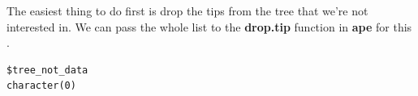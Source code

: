 \documentclass[
]{book}
\newenvironment{Shaded}{\begin{snugshade}}{\end{snugshade}}
\newcommand{\KeywordTok}[1]{\textcolor[rgb]{0.13,0.29,0.53}{\textbf{#1}}}
\newcommand{\NormalTok}[1]{#1}
\newcommand{\OperatorTok}[1]{\textcolor[rgb]{0.81,0.36,0.00}{\textbf{#1}}}
\newcommand{\StringTok}[1]{\textcolor[rgb]{0.31,0.60,0.02}{#1}}
\begin{document}
The easiest thing to do first is drop the tips from the tree that we're not interested in. We can pass the whole list to the \textbf{drop.tip} function in \textbf{ape} for this \citep{ape}.

\begin{Shaded}
\end{Shaded}

\begin{verbatim}
$tree_not_data
character(0)


\end{verbatim}
\end{document}
